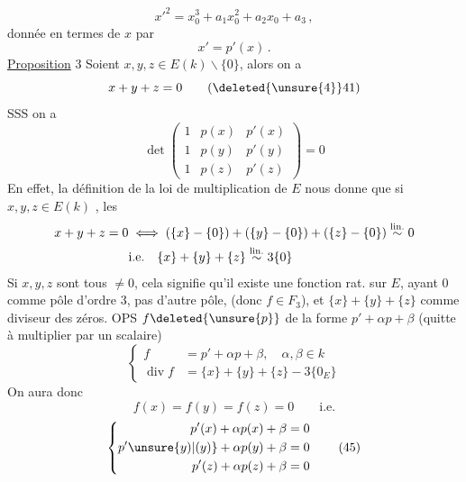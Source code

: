 \[
 {x'}^2=x_0^3+a_1x_0^2+a_2x_0+a_3\,, \tag*{(39)}
\]
donnée en termes de $x$ par
\[
 x'=p'(x)\,. \tag*{(40)}
\]
\uline{Proposition} 3 Soient $x,y,z\in E(k)\smallsetminus\{0\}$,  alors on a
\[
 x+y+z=0 \tag*{(\deleted{\unsure{4}}41)}
\]
SSS on a 
\[
 \det\begin{pmatrix}
 1&p(x)&p'(x)\\
 1&p(y)&p'(y)\\
 1&p(z)&p'(z)
 \end{pmatrix}=0 \tag*{(42)}
\]
En effet, la définition de la loi de multiplication de $E$ nous donne que si $x,y,z\in E(k)$ , les 
\[
 \begin{aligned}
 x+y+z=0&\iff(\{x\}-\{0\})+(\{y\}-\{0\})+(\{z\}-\{0\})\overset{\rm lin.}{\sim}0\\
 &\text{i.e.}\quad\{x\}+\{y\}+\{z\}\overset{\rm lin.}{\sim}3\{0\}
 \end{aligned}
\]
Si $x,y,z$ sont tous $\ne0$, cela signifie qu'il existe une fonction rat. sur $E$, ayant $0$ comme pôle d'ordre 3, pas d'autre pôle, (donc $f\in F_3$), et $\{x\}+\{y\}+\{z\}$ comme  diviseur des zéros.
OPS $f\deleted{\unsure{p}}$ de la forme $p'+\alpha p+\beta$ (quitte à multiplier par un scalaire)
\[
 \left\{\begin{aligned}
 f&=p'+\alpha p+\beta,\quad \alpha,\beta\in k\\
 \operatorname{div} f&=\{x\}+\{y\}+\{z\}-3\{0_E\}
 \end{aligned}\right. \tag*{(43)}
\]
On aura donc
\[
 f(x)=f(y)=f(z)=0\qquad\text{i.e.} \tag*{(44)}
\]
\[
 \left\{\begin{aligned}
 p'(x)+\alpha p(x)+\beta&=0\\
 p'\unsure{y)|(y)}+\alpha p(y)+\beta&=0\\
 p'(z)+\alpha p(z)+\beta&=0
 \end{aligned}\right. \tag*{(45)}
\]
